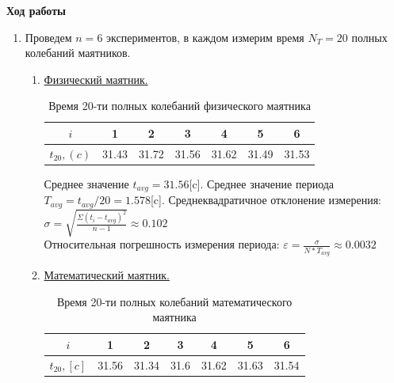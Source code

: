 \documentclass[12pt]{article}
\begin{document}
    \textbf{Ход работы}
    \begin{enumerate} 
        \item Проведем $n = 6$ экспериментов, в каждом измерим время $N_T = 20$ полных колебаний маятников.
        \begin{enumerate}
            \item \underline{Физический маятник.}
            \begin{table}[h]
                    \caption{Время 20-ти полных колебаний физического маятника}
                    \begin{center}
                    \begin{tabular}{|c|c|c|c|c|c|c|}
                            \hline 
                                $i$ & 1 & 2 & 3 & 4 & 5 & 6 \\
                            \hline
                                $t_{20} , (c)$ &31.43&31.72&31.56&31.62&31.49&31.53\\
                            \hline
                            \end{tabular}
                        \end{center}
            \end{table}

            Среднее значение $t_{avg} = 31.56$[c]. Среднее значение периода $T_{avg} = t_{avg}/20 = 1.578$[c].
            Среднеквадратичное отклонение измерения:
            $\sigma = \sqrt{\frac{\Sigma (t_i - t_{avg})^2 }{n-1}} \approx 0.102$ \\
            Относительная погрешность измерения периода: $\varepsilon = \frac{\sigma}{N* T_{avg}} \approx 0.0032$ \\  
        \item \underline{Математический маятник.}
            \begin{table}[h]
                    \caption{Время 20-ти полных колебаний математического маятника}
                    \begin{center}
                    \begin{tabular}{|c|c|c|c|c|c|c|}
                            \hline 
                                $i$ & 1 & 2 & 3 & 4 & 5 & 6 \\
                            \hline
                                $t_{20} , [c]$ &31.56&31.34&31.6&31.62&31.63&31.54\\
                            \hline
                            \end{tabular}
                        \end{center}
            \end{table}


\end{enumerate}
\end{enumerate}
\end{document}

